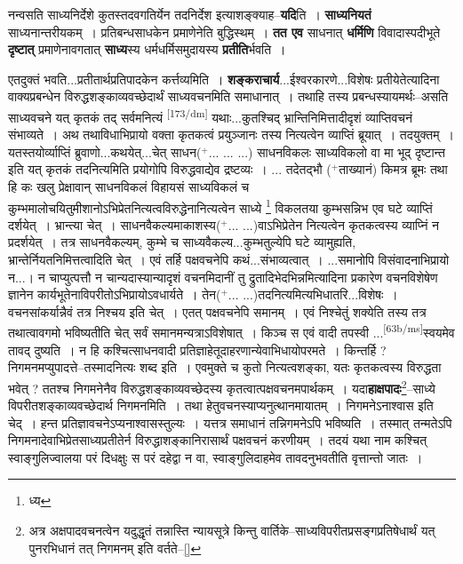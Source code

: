\documentclass[article,12pt,a4paper]{memoir}
\newcommand{\add}[1]{($^{+}$#1)}
\begin{document}
	  \pstart नन्वसति साध्यनिर्देशे कुतस्तदवगतिर्येन तदनिर्देश इत्याशङ्क्याह--\textbf{यदि}ति । \textbf{साध्यनियतं} साध्यनान्तरीयकम् । प्रतिबन्धसाधकेन प्रमाणेनेति बुद्धिस्थम् । \textbf{तत एव} साधनात् \textbf{धर्मिणि} विवादास्पदीभूते \textbf{दृष्टात्} प्रमाणेनावगतात् \textbf{साध्य}स्य धर्मधर्मिसमुदायस्य \textbf{प्रतीति}र्भवति ।
	\pend
      

	  \pstart एतदुक्तं भवति...प्रतीतार्थप्रतिपादकेन कर्त्तव्यमिति । \textbf{शङ्कराचार्य}...ईश्वरकारणे...विशेषः प्रतीयेतेत्यादिना वाक्यप्रबन्धेन विरुद्धशङ्काव्यवच्छेदार्थं साध्यवचनमिति समाधानात् । तथाहि तस्य प्रबन्धस्यायमर्थः--असति साध्यवचने यत् कृतकं तद् सर्वमनित्यं  \leavevmode\textsuperscript{\rmlatinfont\tiny [173/dm]} यथाः...कुतश्चिद् भ्रान्तिनिमित्तादीदृशं व्याप्तिवचनं संभाव्यते । अथ तथाविधाभिप्रायो वक्ता कृतकत्वं प्रयुञ्जानः तस्य नित्यत्वेन व्याप्तिं ब्रूयात् । तदयुक्तम् । यतस्तयोर्व्याप्तिं ब्रुवाणो...कथयेत्...चेत् साधन\add{... ... ...} साधनविकलः साध्यविकलो वा मा भूद् दृष्टान्त इति यत् कृतकं तदनित्यमिति प्रयोगोपि विरुद्धवाद्येव द्रष्टव्यः । ... तदेतद्भौ \add{ताख्यानं} किमत्र ब्रूमः तथा हि कः खलु प्रेक्षावान् साधनविकलं विहायसं साध्यविकलं च कुम्भमालोचयितुमीशानोऽभिप्रेतनित्यत्वविरुद्धेनानित्यत्वेन साध्ये \footnote{ध्य} विकलतया कुम्भसन्निभ एव घटे व्याप्तिं दर्शयेत् । भ्रान्त्या चेत् । साधनवैकल्यमाकाशस्य\add{... ...}वाऽभिप्रेतेन नित्यत्वेन कृतकत्वस्य व्याप्निं न प्रदर्शयेत् । तत्र साधनवैकल्यम्, कुम्भे च साध्यवैकल्य...कुम्भतुल्येपि घटे व्यामुह्यति, भ्रान्तेर्नियतनिमित्तत्वादिति चेत् । एवं तर्हि पक्षवचनेपि कथं...संभाव्यत्वात् । ...समानोपि विसंवादनाभिप्रायो न...। न चाप्युत्पत्तौ न चान्यदास्यान्यादृशं वचनमिदानीं तु द्रुतादिभेदभिन्नमित्यादिना प्रकारेण वचनविशेषेण ज्ञानेन कार्यभूतेनाविपरीतोऽभिप्रायोऽवधार्यते । तेन\add{... ...}तदनित्यमित्यभिधातरि...विशेषः । वचनसांकर्यान्नैवं तत्र निश्चय इति चेत् । एतत् पक्षवचनेपि समानम् । एवं निश्चेतुं शक्येति तस्य तत्र तथात्वावगमो भविष्यतीति चेत् सर्वं समानमन्यत्राऽविशेषात् । किञ्च स एवं वादी तपस्वी ...\leavevmode\textsuperscript{\rmlatinfont\tiny [63b/ms]}स्वयमेव तावद् दुष्यति । न हि कश्चित्साधनवादी प्रतिज्ञाहेतूदाहरणान्येवाभिधायोपरमते । किन्तर्हि ? निगमनमप्युपादत्ते--तस्मादनित्यः शब्द इति । एवमुक्ते च कुतो नित्यत्वशङ्का, यतः कृतकत्वस्य विरुद्धता भवेत् ? ततश्च निगमनेनैव विरुद्धशङ्काव्यवच्छेदस्य कृतत्वात्पक्षवचनमपार्थकम् । यदा\textbf{हाक्षपादः}\footnote{अत्र अक्षपादवचनत्वेन यदुद्धृतं तन्नास्ति न्यायसूत्रे किन्तु वार्तिके--साध्यविपरीतप्रसङ्गप्रतिषेधार्थं यत् पुनरभिधानं तत् निगमनम् इति वर्तते--\cref{}}--साध्ये विपरीतशङ्काव्यवच्छेदार्थ निगमनमिति । तथा हेतुवचनस्याप्यनुत्थानमायातम् । निगमनेऽनाश्वास इति चेद् । हन्त प्रतिज्ञावचनेऽप्यनाश्वासस्तुल्यः । यत्तत्र समाधानं तन्निगमनेऽपि भविष्यति । तस्मात् तन्मतेऽपि निगमनादेवाभिप्रेतसाध्यप्रतीतेर्न विरुद्धाशङ्कानिरासार्थं पक्षवचनं करणीयम् । तदयं यथा नाम कश्चित् स्वाङ्गुलिज्वालया परं दिधक्षुः स परं दहेद्वा न वा, स्वाङ्गुलिदाहमेव तावदनुभवतीति वृत्तान्तो जातः ।
	\pend
      
\end{document}
